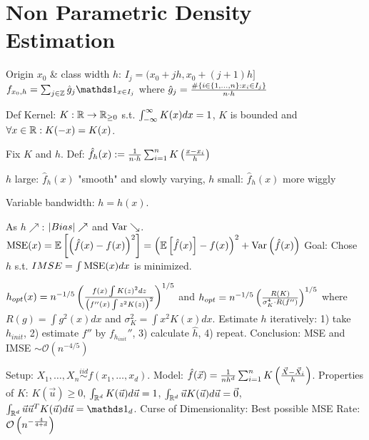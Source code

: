 \section{Non Parametric Density Estimation}

\vspace{-5pt}

 Origin $x_0$ \& class width $h$: $I_j = (x_0 + j h,x_0+(j+1)h]$
$f_{x_0,h} = \sum_{j \in \Z} \hat{g}_j \id_{x \in I_j}$ where $\hat{g}_j = \frac{\# \left\{ i \in \left\{ 1,\dots,n \right\}: x_i \in I_j \right\}}{n \cdot h}$

\vspace{4pt}

Def Kernel: $K: \mathbb{R} \rightarrow \mathbb{R}_{\geq 0}$ s.t. $\int_{-\infty}^\infty K(x) dx = 1$, $K$ is bounded and $\forall x \in \mathbb{R}: K(-x) = K(x)$. 

Fix $K$ and $h$. Def: $\hat{f}_h (x) := \frac{1}{n \cdot h} \sum_{i=1}^n K \left( \frac{x-x_i}{h} \right)$

\vspace{4pt}

$h$ large: $\hat{f}_h (x)$ "smooth" and slowly varying, $h$ small: $\hat{f}_h (x)$ more wiggly

\vspace{4pt}

Variable bandwidth: $h = h(x)$.

\vspace{4pt}

As $h \nearrow$: $\left\vert Bias \right\vert \nearrow$ and $\text{Var} \searrow$.
$\text{MSE}(x) = \mathbb{E} \left[ \left( \hat{f}(x) - f(x) \right)^2 \right] = \left( \mathbb{E}\left[ \hat{f}(x) \right] - f(x) \right)^2 + \text{Var}\left( \hat{f}(x) \right)$
Goal: Chose $h$ s.t. $IMSE = \int \text{MSE}(x) dx$ is minimized.

$h_{opt} (x) = n^{-1/5} \left( \frac{f(x) \int K(z)^2 dz}{\left( f''(x) \int z^2 K(z) \right)^2} \right)^{1/5}$ and
$h_{opt} = n^{-1/5} \left( \frac{R(K)}{\sigma_K^4 \cdot R(f'')} \right)^{1/5}$
where $R(g) = \int g^2(x) dx$ and $\sigma_K^2 = \int x^2 K(x) dx$.
Estimate $h$ iteratively: 1) take $h_{init}$, 2) estimate $f''$ by $f_{h_{init}}''$, 3) calculate $\hat{h}$, 4) repeat.
Conclusion: MSE and IMSE $\sim \mathcal{O} (n^{-4/5})$

\vspace{4pt}

Setup: $X_1,\dots,X_n \stackrel{iid}{\sim} f(x_1,\dots,x_d)$. Model: $\hat{f} (\vec{x}) = \frac{1}{n h^d} \sum_{i=1}^n K \left( \frac{\vec{X} - \vec{X}_i}{h} \right)$. Properties of $K$: $K(\vec{u}) \geq 0$, $\int_{\mathbb{R}^d} K(\vec{u}) d \vec{u} = 1$, $\int_{\mathbb{R}^d} \vec{u} K(\vec{u}) d \vec{u} = \vec{0}$, $\int_{\R^d} \vec{u} \vec{u}^T K(\vec{u}) d \vec{u} = \id_d$.
Curse of Dimensionality: Best possible MSE Rate: $\mathcal{O} \left( n^{- \frac{4}{4+d}} \right)$
